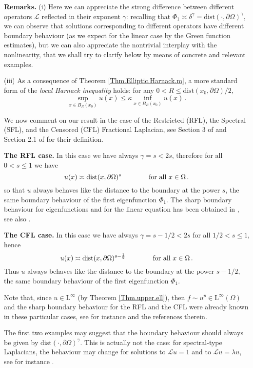\documentclass[11pt]{article}
\numberwithin{equation}{section}
\def\LL{\mathrm{L}} %
\newcommand{\A}{\mathcal{L}}
\newcommand{\p}{{\delta^\gamma}} %
\renewcommand{\k}{\kappa}
\def\dist{\mathrm{dist}} %
\begin{document}
\noindent\textbf{Remarks. }(i) Here we can appreciate the strong difference between different operators $\A$ reflected in their exponent $\gamma$: recalling that $\Phi_1\asymp\p=\dist(\cdot,\partial\Omega)^\gamma$, we can observe that solutions corresponding to different operators have different boundary behaviour (as we expect for the linear case by the Green function estimates), but we can also appreciate the nontrivial interplay with the nonlinearity, that we shall try to clarify below by means of concrete and relevant examples.


\noindent(iii) As a consequence of Theorem \ref{Thm.Elliptic.Harnack.m}, a more standard form of the \textit{local Harnack inequality }holds: for any $0<R\le \dist(x_0, \partial\Omega)/2$,
\begin{equation}\label{local.Harnack}
\sup_{x\in B_R(x_0)}u(x)\le \k \inf_{x\in B_R(x_0)}u(x)\,.
\end{equation}


We now comment on our result in the case
of the Restricted (RFL), the Spectral (SFL), and the Censored (CFL) Fractional Laplacian, see Section 3 of \cite{BV-PPR2-1} and Section 2.1 of \cite{BFV-Parabolic} for their definition.

\noindent\textbf{The RFL case. }In this case we have always $\gamma=s<2s$, therefore for all $0<s \le 1$ we have
\[
u(x)\asymp\dist(x,\partial\Omega)^s\qquad\qquad\mbox{for   all $x\in \Omega$\,.}
\]
so that $u$ always behaves like the distance to the boundary at the power $s$, the same boundary behaviour of the first eigenfunction $\Phi_1$. The sharp boundary behaviour for eigenfunctions and for the linear equation has been obtained in \cite{RosSer}, see also \cite{Grub1}.

\noindent\textbf{The CFL case. }In this case we have always $\gamma=s-1/2<2s$ for all $1/2<s \le 1$, hence
\[
u(x)\asymp\dist(x,\partial\Omega)^{s-\frac{1}{2}}\qquad\qquad\mbox{for   all $x\in \Omega$\,.}
\]
Thus $u$ always behaves like the distance to the boundary at the power $s-1/2$, the same boundary behaviour of the first eigenfunction $\Phi_1$.


Note that, since $u\in \LL^\infty$ (by Theorem \ref{Thm.upper.ell}), then  $f\sim u^p\in \LL^{\infty}(\Omega)$
and the sharp boundary behaviour for the RFL and the CFL were already known in these particular cases, see for instance \cite{BFR,Ka,RosOton1} and the references therein.

The first two examples may suggest that the boundary behaviour should always be given by $\dist(\cdot,\partial\Omega)^\gamma$. This is actually not the case: for spectral-type Laplacians, the behaviour may change for solutions to $\A u=1$ and to $\A u=\lambda u$, see for instance \cite{CDDS, CS2016}.
\end{document}
